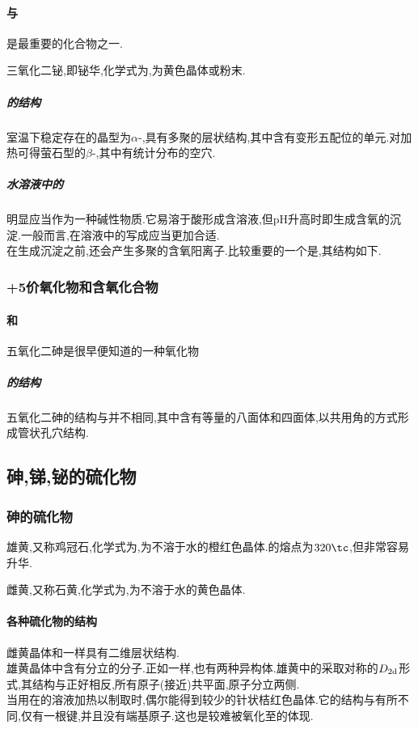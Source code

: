 \documentclass{ctexart}
\begin{document}
\paragraph{与}
是最重要的化合物之一.
\begin{substance}
    三氧化二铋,即铋华,化学式为,为黄色晶体或粉末.
\end{substance}
\subparagraph{的结构}
室温下稳定存在的晶型为$\alpha$-,具有多聚的层状结构,其中含有变形五配位的单元.对加热可得萤石型的$\beta$-,其中有统计分布的空穴.
\subparagraph{水溶液中的}
明显应当作为一种碱性物质.它易溶于酸形成含溶液,但pH升高时即生成含氧的沉淀.一般而言,在溶液中的写成应当更加合适.\\
\indent 在生成沉淀之前,还会产生多聚的含氧阳离子.比较重要的一个是,其结构如下.
\subsubsection{+5价氧化物和含氧化合物}
\paragraph{和}
五氧化二砷是很早便知道的一种氧化物
\subparagraph{的结构}
五氧化二砷的结构与并不相同,其中含有等量的八面体和四面体,以共用角的方式形成管状孔穴结构.
\subsection{砷,锑,铋的硫化物}
\subsubsection{砷的硫化物}
\begin{substance}[\ce{As4S4}]
    雄黄,又称鸡冠石,化学式为,为不溶于水的橙红色晶体.的熔点为$320\tc$,但非常容易升华.
\end{substance}
\begin{substance}[\ce{As2S3}]
    雌黄\footnotemark,又称石黄,化学式为,为不溶于水的黄色晶体.
\end{substance}
\paragraph{各种硫化物的结构}
雌黄晶体和一样具有二维层状结构.\\
\indent 雄黄晶体中含有分立的分子.正如一样,也有两种异构体.雄黄中的采取对称的$D_{2\text d}$形式,其结构与正好相反,所有原子(接近)共平面,原子分立两侧.\\
\indent 当用在的溶液加热以制取时,偶尔能得到较少的针状桔红色晶体.它的结构与有所不同,仅有一根键,并且没有端基原子.这也是较难被氧化至的体现.
\end{document}
